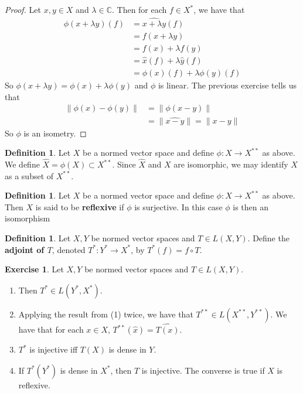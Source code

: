 \documentclass[12pt]{amsart}
\theoremstyle{definition}
\newtheorem{defn}[definition]{Definition}
\newtheorem{ex}[definition]{Exercise}
\newcommand{\lam}{\lambda}
\newcommand{\C}{\mathbb{C}}
\newcommand{\lex}[1]{\label{ex:#1}}
\newcommand{\ld}[1]{\label{defn:#1}}
\begin{document}
	\begin{proof}
		Let $x,y \in X$ and $\lam \in \C$. Then for each $f \in X^*$, we have that 
		\begin{align*}
			\phi(x+ \lam y)(f) 
			&= \widehat{x+ \lam y}(f) \\
			&= f(x+\lam y) \\
			&= f(x) + \lam f(y) \\
			&= \hat{x}(f) + \lam \hat{y}(f)\\
			&= \phi(x)(f) + \lam \phi(y)(f)
		\end{align*} 
		So $\phi(x+ \lam y) = \phi(x) + \lam \phi(y)$ and $\phi$ is linear. The previous exercise tells us that 
		\begin{align*}
			\|\phi(x) - \phi(y) \|
			&= \|\phi(x-y)\|\\
			&= \|\widehat{x-y} \|= \|x-y \|
		\end{align*}
		So $\phi$ is an isometry.
	\end{proof}
	
	\begin{defn} \ld{}
		Let $X$ be a normed vector space and define $\phi:X \rightarrow X^{**}$ as above. We define $\widehat{X} = \phi(X) \subset X^{**}$. Since $\widehat{X}$ and $X$ are isomorphic, we may identify $X$ as a subset of $X^{**}$. 
	\end{defn}
	
	\begin{defn} \ld{}
		Let $X$ be a normed vector space and define $\phi:X \rightarrow X^{**}$ as above. Then $X$ is said to be \textbf{reflexive} if $\phi$ is surjective. In this case $\phi$ is then an isomorphism
	\end{defn}

	\begin{defn}
	Let $X,Y$ be normed vector spaces and $T \in L(X,Y)$. Define the \textbf{adjoint of $T$}, denoted  $T^*:Y^* \rightarrow X^*$, by $T^*(f) = f \circ T$. 
	\end{defn}
	
	\begin{ex} \lex{}
		Let $X,Y$ be normed vector spaces and $T \in L(X,Y)$. 
		\begin{enumerate}
			\item Then $T^* \in L(Y^*, X^*)$.
			\item Applying the result from (1) twice, we have that $T^{**} \in L(X^{**},Y^{**})$. We have that for each $x \in X$, $T^{**}(\hat{x}) = \widehat{T(x)}$.
			\item $T^*$ is injective iff $T(X)$ is dense in $Y$.
			\item If $T^*(Y^*)$ is dense in $X^*$, then $T$ is injective. The converse is true if $X$ is reflexive.
		\end{enumerate}
	\end{ex}
	
\end{document}
